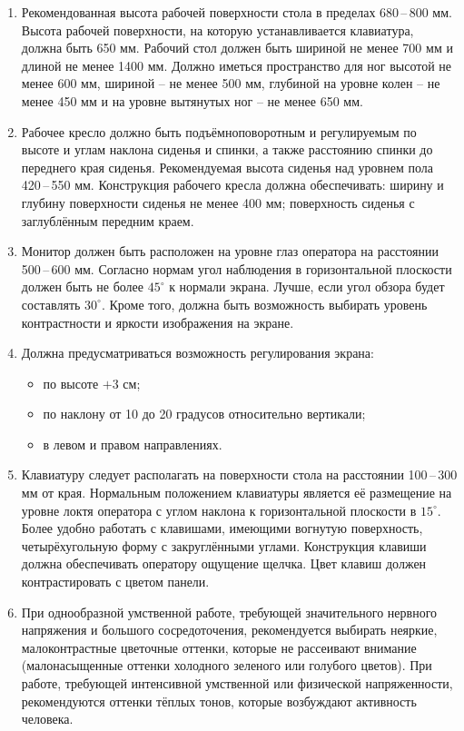 \begin{enumerate}
[leftmargin=0pt,itemindent=\parindent+\labelwidth+\labelsep]
    \item Рекомендованная высота рабочей поверхности стола в пределах 680\,--\,800 мм. 
    Высота рабочей поверхности, на которую устанавливается клавиатура, должна быть 650 мм. 
    Рабочий стол должен быть шириной не менее 700 мм и длиной не менее 1400 мм. 
    Должно иметься пространство для ног высотой не менее 600 мм, шириной -- не менее 500 мм, глубиной на уровне колен -- не менее 450 мм и на уровне вытянутых ног -- не менее 650 мм.
    \item Рабочее кресло должно быть подъёмно\-поворотным и регулируемым по высоте и углам наклона сиденья и спинки, а также расстоянию спинки до переднего края сиденья. 
    Рекомендуемая высота сиденья над уровнем пола 420\,--\,550 мм. 
    Конструкция рабочего кресла должна обеспечивать: ширину и глубину поверхности сиденья не менее 400 мм; поверхность сиденья с заглублённым передним краем.
    \item Монитор должен быть расположен на уровне глаз оператора на расстоянии 500\,--\,600 мм. 
    Согласно нормам угол наблюдения в горизонтальной плоскости должен быть не более $45^\circ$ к нормали экрана.
    Лучше, если угол обзора будет составлять $30^\circ$. 
    Кроме того, должна быть возможность выбирать уровень контрастности и яркости изображения на экране.
    \item Должна предусматриваться возможность регулирования экрана:
    \begin{itemize}[leftmargin=\leftmargin++]
        \item по высоте $+3$ см;
        \item по наклону от 10 до 20 градусов относительно вертикали;
        \item в левом и правом направлениях.
    \end{itemize}
    \item Клавиатуру следует располагать на поверхности стола на расстоянии 100\,--\,300 мм от края. 
    Нормальным положением клавиатуры является её размещение на уровне локтя оператора с углом наклона к горизонтальной плоскости в $15^\circ$. 
    Более удобно работать с клавишами, имеющими вогнутую поверхность, четырёхугольную форму с закруглёнными углами.
    Конструкция клавиши должна обеспечивать оператору ощущение щелчка. 
    Цвет клавиш должен контрастировать с цветом панели.
    \item При однообразной умственной работе, требующей значительного нервного напряжения и большого сосредоточения, рекомендуется выбирать неяркие, малоконтрастные цветочные оттенки, которые не рассеивают внимание (малонасыщенные оттенки холодного зеленого или голубого цветов). 
    При работе, требующей интенсивной умственной или физической напряженности, рекомендуются оттенки тёплых тонов, которые возбуждают активность человека. 
\end{enumerate}


